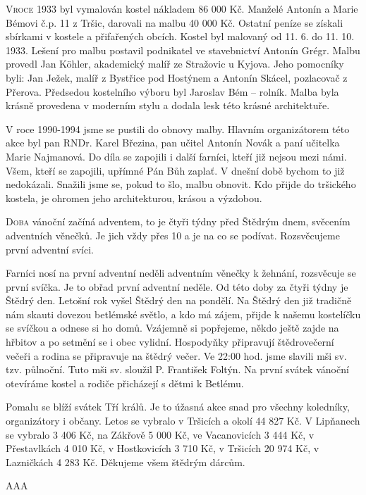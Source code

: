 \documentclass{article}
\begin{document}
\begin{multicols}{2}{

\lettrine{V}{roce} 1933 byl vymalován kostel nákladem 86 000 Kč. Manželé Antonín a Marie Bémovi č.p. 11 z Tršic, darovali na malbu 40 000 Kč. Ostatní peníze se získali sbírkami v kostele a přifařených obcích. Kostel byl malovaný od 11. 6. do 11. 10. 1933. Lešení pro malbu postavil podnikatel ve stavebnictví Antonín Grégr. Malbu provedl Jan Köhler, akademický malíř ze Stražovic u Kyjova. Jeho pomocníky byli: Jan Ježek, malíř z Bystřice pod Hostýnem a Antonín Skácel, pozlacovač z Přerova. Předsedou kostelního výboru byl Jaroslav Bém – rolník. Malba byla krásně provedena v moderním stylu a dodala lesk této krásné architektuře.

V roce 1990-1994 jsme se pustili do obnovy malby. Hlavním organizátorem této akce byl pan RNDr. Karel Březina, pan učitel Antonín Novák a paní učitelka Marie Najmanová. Do díla se zapojili i další farníci, kteří již nejsou mezi námi. 
Všem, kteří se zapojili, upřímné Pán Bůh zaplať. V dnešní době bychom to již nedokázali.
Snažili jsme se, pokud to šlo, malbu obnovit. Kdo přijde do tršického kostela, je ohromen jeho architekturou, krásou a výzdobou.
\closearticle


\lettrine{D}{oba} vánoční začíná adventem, to je čtyři týdny před Štědrým dnem, svěcením adventních věnečků. Je jich vždy přes 10 a je na co se podívat.  Rozsvěcujeme první adventní svíci.

Farníci nosí na první adventní neděli adventním věnečky k žehnání, rozsvěcuje se první svíčka. Je to obřad první adventní neděle. Od této doby za čtyři týdny je Štědrý den. Letošní rok vyšel Štědrý den na pondělí. Na Štědrý den již tradičně nám skauti dovezou betlémské světlo, a kdo má zájem, přijde k našemu kostelíčku se svíčkou a odnese si ho domů. Vzájemně si popřejeme, někdo ještě zajde na hřbitov a po setmění se i obec vylidní. Hospodyňky připravují štědrovečerní večeři a rodina se připravuje na štědrý večer. Ve 22:00 hod. jsme slavili mši sv. tzv. půlnoční. Tuto mši sv. sloužil P. František Foltýn. Na první svátek vánoční otevíráme kostel a rodiče přicházejí s dětmi k Betlému.

Pomalu se blíží svátek Tří králů. Je to úžasná akce snad pro všechny koledníky, organizátory i občany. Letos se vybralo v Tršicích a okolí 44 827 Kč. V Lipňanech se vybralo 3 406 Kč, na Zákřově 5 000 Kč, ve Vacanovicích 3 444 Kč, v Přestavlkách 4 010 Kč, v Hostkovicích 3 710 Kč, v Tršicích 20 974 Kč, v Lazničkách 4 283 Kč. Děkujeme všem štědrým dárcům.
}\end{multicols}

\newpage
\pagestyle{myinfo}

AAA
\end{document}
